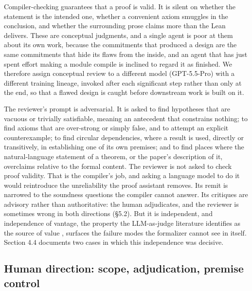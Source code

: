 \documentclass[11pt]{article}
\begin{document}
Compiler-checking guarantees that a proof is valid. It is silent on whether the statement is the
intended one, whether a convenient axiom smuggles in the conclusion, and whether the surrounding
prose claims more than the Lean delivers. These are conceptual judgments, and a single agent is
poor at them about its own work, because the commitments that produced a design are the same
commitments that hide its flaws from the inside, and an agent that has just spent effort making a
module compile is inclined to regard it as finished. We therefore assign conceptual review to a
different model (GPT-5.5-Pro) with a different training lineage, invoked after each significant step
rather than only at the end, so that a flawed design is caught before downstream work is built on
it.

The reviewer's prompt is adversarial. It is asked to find hypotheses that are vacuous or trivially
satisfiable, meaning an antecedent that constrains nothing; to find axioms that are over-strong or
simply false, and to attempt an explicit counterexample; to find circular dependencies, where a
result is used, directly or transitively, in establishing one of its own premises; and to find
places where the natural-language statement of a theorem, or the paper's description of it,
overclaims relative to the formal content. The reviewer is not asked to check proof validity. That
is the compiler's job, and asking a language model to do it would reintroduce the unreliability the
proof assistant removes. Its remit is narrowed to the soundness questions the compiler cannot
answer. Its critiques are advisory rather than authoritative: the human adjudicates, and the
reviewer is sometimes wrong in both directions (§5.2). But it is independent, and independence of
vantage, the property the LLM-as-judge literature identifies as the source of value \cite{r19,r22},
surfaces the failure modes the formalizer cannot see in itself. Section 4.4 documents two cases in
which this independence was decisive.

\subsection{Human direction: scope, adjudication, premise control}
\end{document}
